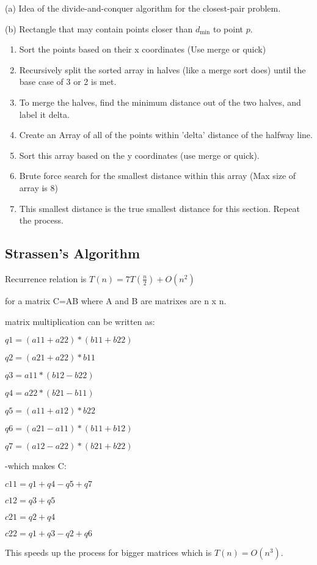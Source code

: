 {\scriptsize
(a) Idea of the divide-and-conquer algorithm for the closest-pair problem.

(b) Rectangle that may contain points closer than $d_{\text{min}}$ to point $p$.
}

\begin{enumerate}
    \item Sort the points based on their x coordinates (Use merge or quick)
    \item Recursively split the sorted array in halves (like a merge sort does) until the base case of 3 or 2 is met.
    \item To merge the halves, find the minimum distance out of the two halves, and label it delta. 
    \item Create an Array of all of the points within 'delta' distance of the halfway line.
    \item Sort this array based on the y coordinates (use merge or quick).
    \item Brute force search for the smallest distance within this array (Max size of array is 8) 
    \item This smallest distance is the true smallest distance for this section. Repeat the process.
\end{enumerate}
\subsection*{Strassen's Algorithm}
Recurrence relation is $T(n) = 7T(\frac{n}{2}) + O(n^2)$

for a matrix C=AB
where A and B are matrixes are n x n.

matrix multiplication can be written as:

$q1 = (a11 + a22) * (b11 + b22)$

$q2 = (a21 + a22) * b11$

$q3 = a11*( b12 - b22)$

$q4 = a22 * (b21 - b11)$

$q5 = (a11 + a12) * b22$

$q6 = (a21 - a11) * (b11 + b12)$

$q7 = (a12 - a22) * (b21 + b22)$

-which makes C:

$c11 = q1 + q4 - q5 + q7$

$c12 = q3 + q5$

$c21 = q2 + q4$

$c22 = q1 + q3 - q2 + q6$

This speeds up the process for bigger matrices which is $T(n) = O(n^3)$.

